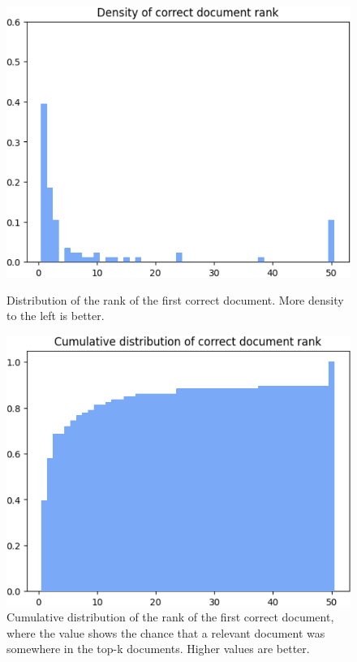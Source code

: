 \begin{figure}[H]
\centering
\begin{minipage}{0.48\linewidth}
    \centerline{\includegraphics[width=\linewidth]{fig/rag_distribution.png}}
    \caption{Distribution of the rank of the first correct document. More density to the left is better.}
    \label{fig:chunk_rank_density}
\end{minipage}
\hfill
\begin{minipage}{0.48\linewidth}
    \vspace{24pt}
    \centerline{\includegraphics[width=\linewidth]{fig/rag_cumulative_doc_rank.png}}
    \caption{Cumulative distribution of the rank of the first correct document, where the value shows the chance that a relevant document was somewhere in the top-k documents. Higher values are better.}
    \label{fig:chunk_rank_cumulative_distribution}
\end{minipage}
\end{figure}

